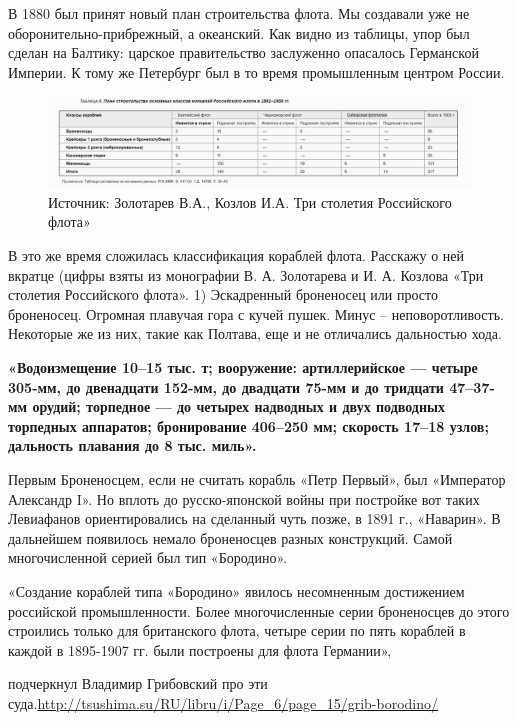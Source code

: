 В 1880 был принят новый план строительства флота. Мы создавали уже не оборонительно-прибрежный, а океанский. Как видно из таблицы, упор был сделан на Балтику: царское правительство заслуженно опасалось Германской Империи. К тому же Петербург был в то время промышленным центром России.

\begin{figure}[h!tb] 
	\centering\includegraphics[scale=0.4]{Data/RYAV_sily_storon/eAX9dphs0L4.jpg}
	\caption{Источник: Золотарев В.А., Козлов И.А. Три столетия Российского флота»}%
\end{figure}

В это же время сложилась классификация кораблей флота. Расскажу о ней вкратце (цифры взяты из монографии В. А. Золотарева и И. А. Козлова «Три столетия Российского флота».
1) Эскадренный броненосец или просто броненосец. Огромная плавучая гора с кучей пушек. Минус – неповоротливость. Некоторые же из них, такие как Полтава, еще и не отличались дальностью хода.

\textbf{«Водоизмещение 10–15 тыс. т; вооружение: артиллерийское — четыре 305-мм, до двенадцати 152-мм, до двадцати 75-мм и до тридцати 47–37-мм орудий; торпедное — до четырех надводных и двух подводных торпедных аппаратов; бронирование 406–250 мм; скорость 17–18 узлов; дальность плавания до 8 тыс. миль».}


Первым Броненосцем, если не считать корабль «Петр Первый», был «Император Александр I». Но вплоть до русско-японской войны при постройке вот таких Левиафанов ориентировались на сделанный чуть позже, в 1891 г., «Наварин». В дальнейшем появилось немало броненосцев разных конструкций. Самой многочисленной серией был тип «Бородино».
\begin{textcitation}
«Создание кораблей типа «Бородино» явилось несомненным достижением российской промышленности. Более многочисленные серии броненосцев до этого строились только для британского флота, четыре серии по пять кораблей в каждой в 1895-1907 гг. были построены для флота Германии»,	
\end{textcitation}
подчеркнул Владимир Грибовский про эти суда.\url{http://tsushima.su/RU/libru/i/Page_6/page_15/grib-borodino/}


